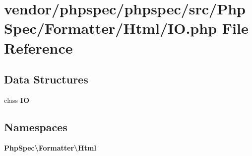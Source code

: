 \section{vendor/phpspec/phpspec/src/\+Php\+Spec/\+Formatter/\+Html/\+I\+O.php File Reference}
\label{_formatter_2_html_2_i_o_8php}
\subsection*{Data Structures}
\begin{DoxyCompactItemize}
\item 
class {\bf I\+O}
\end{DoxyCompactItemize}
\subsection*{Namespaces}
\begin{DoxyCompactItemize}
\item 
 {\bf Php\+Spec\textbackslash{}\+Formatter\textbackslash{}\+Html}
\end{DoxyCompactItemize}
